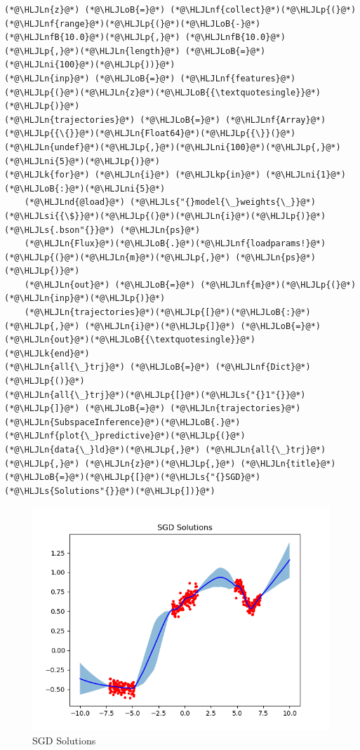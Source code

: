 \documentclass[12pt,a4paper]{article}
\newcommand{\HLJLk}[1]{\textcolor[RGB]{148,91,176}{\textbf{#1}}}
\newcommand{\HLJLkp}[1]{\textcolor[RGB]{148,91,176}{\textbf{#1}}}
\newcommand{\HLJLn}[1]{#1}
\newcommand{\HLJLnd}[1]{\textcolor[RGB]{214,102,97}{#1}}
\newcommand{\HLJLnf}[1]{\textcolor[RGB]{66,102,213}{#1}}
\newcommand{\HLJLs}[1]{\textcolor[RGB]{201,61,57}{#1}}
\newcommand{\HLJLsi}[1]{#1}
\newcommand{\HLJLnfB}[1]{\textcolor[RGB]{59,151,46}{#1}}
\newcommand{\HLJLni}[1]{\textcolor[RGB]{59,151,46}{#1}}
\newcommand{\HLJLoB}[1]{\textcolor[RGB]{102,102,102}{\textbf{#1}}}
\newcommand{\HLJLp}[1]{#1}
\begin{document}
\begin{lstlisting}
(*@\HLJLn{z}@*) (*@\HLJLoB{=}@*) (*@\HLJLnf{collect}@*)(*@\HLJLp{(}@*)(*@\HLJLnf{range}@*)(*@\HLJLp{(}@*)(*@\HLJLoB{-}@*)(*@\HLJLnfB{10.0}@*)(*@\HLJLp{,}@*) (*@\HLJLnfB{10.0}@*)(*@\HLJLp{,}@*)(*@\HLJLn{length}@*) (*@\HLJLoB{=}@*) (*@\HLJLni{100}@*)(*@\HLJLp{))}@*)
(*@\HLJLn{inp}@*) (*@\HLJLoB{=}@*) (*@\HLJLnf{features}@*)(*@\HLJLp{(}@*)(*@\HLJLn{z}@*)(*@\HLJLoB{{\textquotesingle}}@*)(*@\HLJLp{)}@*)
(*@\HLJLn{trajectories}@*) (*@\HLJLoB{=}@*) (*@\HLJLnf{Array}@*)(*@\HLJLp{{\{}}@*)(*@\HLJLn{Float64}@*)(*@\HLJLp{{\}}(}@*)(*@\HLJLn{undef}@*)(*@\HLJLp{,}@*)(*@\HLJLni{100}@*)(*@\HLJLp{,}@*)(*@\HLJLni{5}@*)(*@\HLJLp{)}@*)
(*@\HLJLk{for}@*) (*@\HLJLn{i}@*) (*@\HLJLkp{in}@*) (*@\HLJLni{1}@*)(*@\HLJLoB{:}@*)(*@\HLJLni{5}@*)
	(*@\HLJLnd{@load}@*) (*@\HLJLs{"{}model{\_}weights{\_}}@*)(*@\HLJLsi{{\$}}@*)(*@\HLJLp{(}@*)(*@\HLJLn{i}@*)(*@\HLJLp{)}@*)(*@\HLJLs{.bson"{}}@*) (*@\HLJLn{ps}@*)
	(*@\HLJLn{Flux}@*)(*@\HLJLoB{.}@*)(*@\HLJLnf{loadparams!}@*)(*@\HLJLp{(}@*)(*@\HLJLn{m}@*)(*@\HLJLp{,}@*) (*@\HLJLn{ps}@*)(*@\HLJLp{)}@*)
	(*@\HLJLn{out}@*) (*@\HLJLoB{=}@*) (*@\HLJLnf{m}@*)(*@\HLJLp{(}@*)(*@\HLJLn{inp}@*)(*@\HLJLp{)}@*)
	(*@\HLJLn{trajectories}@*)(*@\HLJLp{[}@*)(*@\HLJLoB{:}@*)(*@\HLJLp{,}@*) (*@\HLJLn{i}@*)(*@\HLJLp{]}@*) (*@\HLJLoB{=}@*) (*@\HLJLn{out}@*)(*@\HLJLoB{{\textquotesingle}}@*)
(*@\HLJLk{end}@*)
(*@\HLJLn{all{\_}trj}@*) (*@\HLJLoB{=}@*) (*@\HLJLnf{Dict}@*)(*@\HLJLp{()}@*)
(*@\HLJLn{all{\_}trj}@*)(*@\HLJLp{[}@*)(*@\HLJLs{"{}1"{}}@*)(*@\HLJLp{]}@*) (*@\HLJLoB{=}@*) (*@\HLJLn{trajectories}@*)
(*@\HLJLn{SubspaceInference}@*)(*@\HLJLoB{.}@*)(*@\HLJLnf{plot{\_}predictive}@*)(*@\HLJLp{(}@*)(*@\HLJLn{data{\_}ld}@*)(*@\HLJLp{,}@*) (*@\HLJLn{all{\_}trj}@*)(*@\HLJLp{,}@*) (*@\HLJLn{z}@*)(*@\HLJLp{,}@*) (*@\HLJLn{title}@*)(*@\HLJLoB{=}@*)(*@\HLJLp{[}@*)(*@\HLJLs{"{}SGD}@*) (*@\HLJLs{Solutions"{}}@*)(*@\HLJLp{])}@*)
\end{lstlisting}

\begin{figure}
\centering
\includegraphics{img/sgd_sol.png}
\caption{SGD Solutions}
\end{figure}
\end{document}

